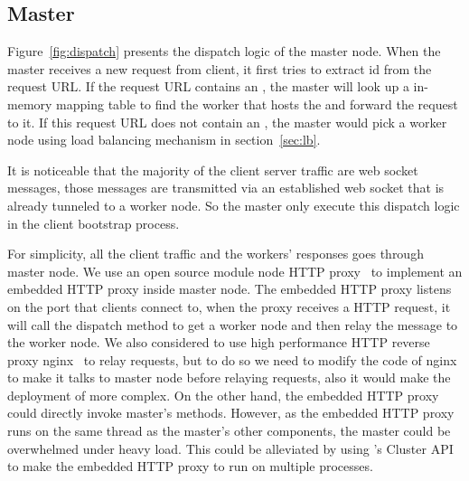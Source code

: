 \subsection{Master}
Figure~\ref{fig:dispatch} presents the dispatch logic of the master node.
When the master receives a new request from client,
it first tries to extract \appins{} id from the request URL.
If the request URL contains an \appins{},
the master will look up a in-memory mapping table to find the worker
that hosts the \appins{} and forward the request to it.
If this request URL does not contain an \appins{},
the master would pick a worker node using load balancing mechanism in section~\ref{sec:lb}.

It is noticeable that the majority of the client server traffic are web socket messages,
those messages are transmitted via an established web socket that is already tunneled to 
a worker node.
So the master only execute this dispatch logic in the client bootstrap process.

For simplicity, all the client traffic and the workers' responses goes through master node.
We use an open source \nodejs{} module node HTTP proxy~\cite{nodeproxy} to implement
an embedded HTTP proxy inside master node.
The embedded HTTP proxy listens on the port that clients connect to,
when the proxy receives a HTTP request,
it will call the dispatch method to get a worker node and then relay the message
to the worker node.
We also considered to use high performance HTTP reverse proxy nginx~\cite{nginx}
to relay requests,
but to do so we need to modify the code of nginx to 
make it talks to master node before relaying requests,
also it would make the deployment of \cb{} more complex.
On the other hand, the embedded HTTP proxy could directly invoke master's methods.
However, as the embedded HTTP proxy runs on the same thread as the master's other
components, the master could be overwhelmed under heavy load.
This could be alleviated by using \nodejs{}'s Cluster API to make the embedded HTTP
proxy to run on multiple processes.

\requestdispatchdiagram{}

